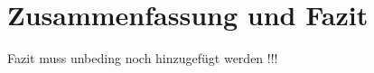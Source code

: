 \documentclass[../../Bachelorarbeit.tex]{subfiles}
\begin{document}
\section{Zusammenfassung und Fazit}
\color{red}
Fazit muss unbeding noch hinzugefügt werden !!!
\end{document}

